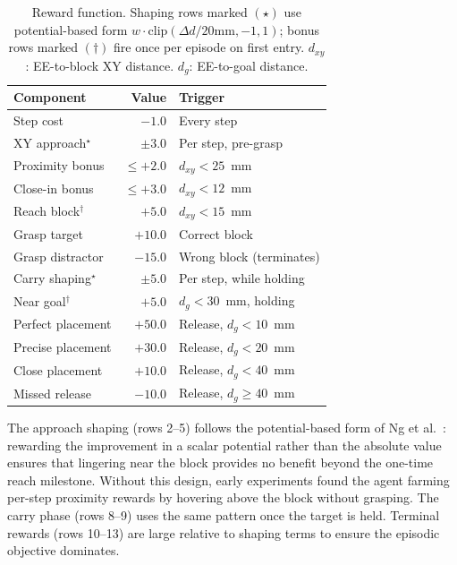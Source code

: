 \documentclass[conference]{IEEEtran}
\begin{document}
\begin{table}[!t]
  \caption{Reward function. Shaping rows marked $(\star)$ use
           potential-based form $w\cdot\mathrm{clip}(\Delta d/20\text{mm},{-1},1)$;
           bonus rows marked $(\dagger)$ fire once per episode on first entry.
           $d_{xy}$: EE-to-block XY distance. $d_g$: EE-to-goal distance.}
  \label{tab:reward}
  \centering
  \small
  \setlength{\tabcolsep}{5pt}
  \begin{tabular}{@{}l r l@{}}
    \toprule
    Component & Value & Trigger \\
    \midrule
    Step cost             & $-1.0$  & Every step \\
    XY approach$^{\star}$ & $\pm 3.0$ & Per step, pre-grasp \\
    Proximity bonus       & $\leq+2.0$ & $d_{xy}<25$~mm \\
    Close-in bonus        & $\leq+3.0$ & $d_{xy}<12$~mm \\
    Reach block$^{\dagger}$ & $+5.0$ & $d_{xy}<15$~mm \\
    Grasp target          & $+10.0$ & Correct block \\
    Grasp distractor      & $-15.0$ & Wrong block (terminates) \\
    Carry shaping$^{\star}$ & $\pm 5.0$ & Per step, while holding \\
    Near goal$^{\dagger}$ & $+5.0$  & $d_g<30$~mm, holding \\
    Perfect placement     & $+50.0$ & Release, $d_g<10$~mm \\
    Precise placement     & $+30.0$ & Release, $d_g<20$~mm \\
    Close placement       & $+10.0$ & Release, $d_g<40$~mm \\
    Missed release        & $-10.0$ & Release, $d_g\ge40$~mm \\
    \bottomrule
  \end{tabular}
\end{table}

The approach shaping (rows 2--5) follows the potential-based form of
Ng et al.~\cite{ng1999potential}: rewarding the improvement in a scalar
potential rather than the absolute value ensures that lingering near the
block provides no benefit beyond the one-time reach milestone.
Without this design, early experiments found the agent farming per-step
proximity rewards by hovering above the block without grasping.
The carry phase (rows 8--9) uses the same pattern once the target is held.
Terminal rewards (rows 10--13) are large relative to shaping terms to
ensure the episodic objective dominates.
\end{document}
